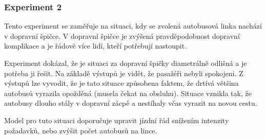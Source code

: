 \documentclass[a4paper]{article}
\begin{document}
            \subsubsection{Experiment 2}
            \label{subsubsec:experiment2}
				Tento experiment se zaměřuje na situaci, kdy se zvolená autobusová linka nachází v dopravní špičce. V dopravní špičce je zvýšená pravděpodobnost dopravní komplikace a je řádově více lidí, kteří potřebují nastoupit.

                \begin{table}[H]
                    \centering
                    \caption{Parametry experimentu 2}
                    \label{tab:experiment2}
                \end{table}

				Experiment dokázal, že je situaci za dopravní špičky diametrálně odlišná a je potřeba ji řešit. Na základě výstupů je vidět, že pasažéři nebyli spokojeni. Z výstupů lze vyvodit, že je tato situace způsobena faktem, že drtívá většina autobusů vyrazila opožděná (musela čekat na obsluhu). Situace vznikla tak, že autobusy dlouho stály v dopravní zácpě a nestíhaly včas vyrazit na novou cestu.
                
                Model pro tuto situaci doporučuje upravit jízdní řád snížením intenzity požadavků, nebo zvýšit počet autobusů na lince.
\end{document}
